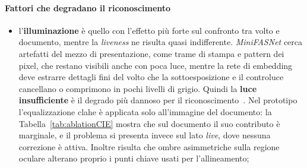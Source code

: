 \paragraph{Fattori che degradano il riconoscimento}
\begin{itemize}
    \item l'\textbf{illuminazione} è quello con l'effetto più forte sul confronto tra volto e documento, mentre la \textit{liveness} ne risulta quasi indifferente.
    \textit{MiniFASNet} cerca artefatti del mezzo di presentazione, come trame di stampa e pattern dei pixel, che restano visibili anche con poca luce, mentre la rete di embedding deve estrarre dettagli fini del volto che la sottoesposizione e il controluce cancellano o comprimono in pochi livelli di grigio.
    Quindi la \textbf{luce insufficiente} è il degrado più dannoso per il riconoscimento~\cite{groteImageQualityAssessment2026}.
    Nel prototipo l'equalizzazione \gls{clahe} è applicata solo all'immagine del documento: la Tabella~\ref{tab:ablationCIE} mostra che sul documento il suo contributo è marginale, e il problema si presenta invece sul lato \textit{live}, dove nessuna correzione è attiva.
    Inoltre risulta che ombre asimmetriche sulla regione oculare alterano proprio i punti chiave usati per l'allineamento;


\end{itemize}
